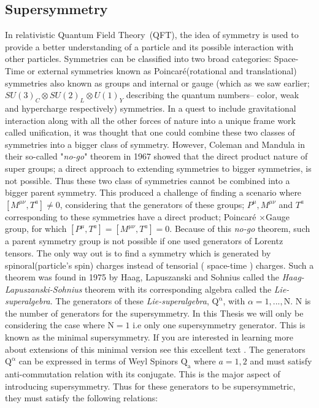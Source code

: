 \subsection{Supersymmetry}
In relativistic Quantum Field Theory~(QFT), the idea of symmetry is used to provide a better understanding of a particle and its possible interaction with other particles. Symmetries can be classified into two broad categories: Space-Time or external symmetries known as Poincar\'{e}(rotational and translational) symmetries also known as groups and internal or gauge (which as we saw earlier; $SU(3)_{C}\otimes SU(2)_{L}\otimes U(1)_{Y}$ describing the quantum numbers-- color, weak and hypercharge respectively) symmetries. In a quest to include gravitational interaction along with all the other forces of nature into a unique frame work called unification, it was thought that one could combine these two classes of symmetries into a bigger class of symmetry. However, Coleman and Mandula in their so-called "\textit{no-go}" theorem in 1967 \cite{SUSY} showed that the direct product nature of super groups; a direct approach to extending symmetries to bigger symmetries, is not possible. Thus these two class of symmetries cannot be combined into a bigger parent symmetry. This produced a challenge of finding a scenario where $ \left[M^{\mu\nu}, T^{a}\right] \neq 0$,  considering  that the generators of these groups; $P^{\mu}, M^{\mu\nu}$ and $T^{a}$ corresponding to these symmetries have a direct product;  Poincar\'{e} $\times$Gauge group, for which $ \left[P^{\mu}, T^{a}\right] = \left[M^{\mu\nu}, T^{a}\right] = 0$. 
\newline
Because of this \textit{no-go} theorem, such a parent symmetry group is not possible if one used generators of Lorentz tensors. The only way out is to find a symmetry which is generated by spinoral(particle's spin) charges instead of tensorial ( space-time ) charges. Such a theorem was found in 1975 by Haag, Lapuszanski and Sohnius \cite{MSUSY}  called the  \textit{Haag-Lapuszanski-Sohnius} theorem with its corresponding algebra called the \textit{Lie-superalgebra}. 
\newline
The generators of these \textit{Lie-superalgebra}, $\mathrm{Q^{\alpha}}$, with $\alpha = 1,...,\mathrm{N}$. $\mathrm{N}$ is the number of generators for the supersymmetry. In this Thesis we will only be considering the case where $\mathrm{N} = 1$ i.e only one supersymmetry generator. This is known as the minimal supersymmetry. If you are interested in  learning more about extensions of this minimal version see this excellent text \cite{SUSYText}. The generators $\mathrm{Q^{\alpha}}$ can be expressed in terms of Weyl Spinors $\mathrm{Q_{a}}$ where $a=1,2$ and must satisfy anti-commutation relation with its conjugate. This is the major aspect of introducing supersymmetry.
Thus for these generators to be supersymmetric, they must satisfy the following relations:

